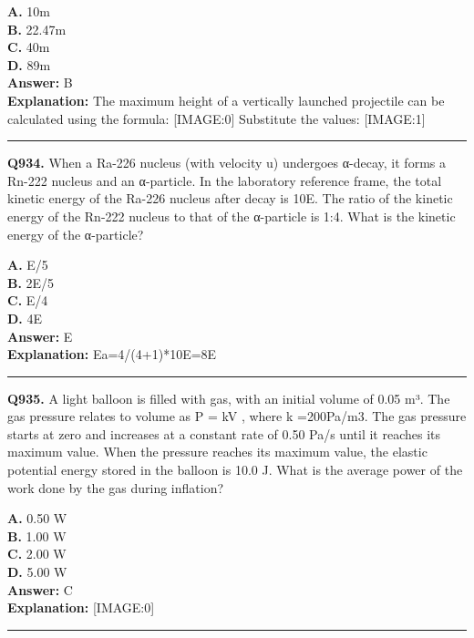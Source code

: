 \documentclass[12pt]{article}
\begin{document}
\textbf{A.} 10m \\
\textbf{B.} 22.47m \\
\textbf{C.} 40m \\
\textbf{D.} 89m \\

\textbf{Answer:} B \\
\textbf{Explanation:} The maximum height of a vertically launched projectile can be calculated using the formula:
[IMAGE:0]
Substitute the values:
[IMAGE:1]

\hrule
\vspace{1em}


\noindent
\textbf{Q934.} When a Ra-226 nucleus (with velocity u) undergoes α-decay, it forms a Rn-222 nucleus and an α-particle. In the laboratory reference frame, the total kinetic energy of the Ra-226 nucleus after decay is 10E. The ratio of the kinetic energy of the Rn-222 nucleus to that of the α-particle is 1:4. What is the kinetic energy of the α-particle?



\textbf{A.} E​/5 \\
\textbf{B.} 2E​/5 \\
\textbf{C.} E​/4 \\
\textbf{D.} 4E \\

\textbf{Answer:} E \\
\textbf{Explanation:} Ea=4/(4+1)*10E=8E

\hrule
\vspace{1em}


\noindent
\textbf{Q935.} A light balloon is filled with gas, with an initial volume of 0.05 m³. The gas pressure relates to volume as
P
=
kV
, where
k
=200Pa/m3. The gas pressure starts at zero and increases at a constant rate of 0.50 Pa/s until it reaches its maximum value. When the pressure reaches its maximum value, the elastic potential energy stored in the balloon is 10.0 J. What is the average power of the work done by the gas during inflation?



\textbf{A.} 0.50 W \\
\textbf{B.} 1.00 W \\
\textbf{C.} 2.00 W \\
\textbf{D.} 5.00 W \\

\textbf{Answer:} C \\
\textbf{Explanation:} [IMAGE:0]

\hrule
\vspace{1em}
\end{document}
